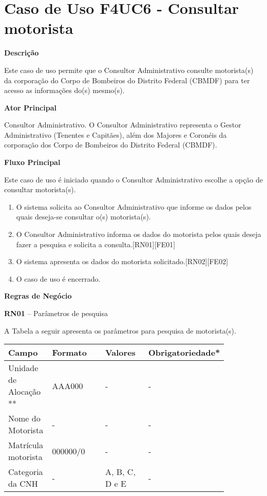 
  \section{Caso de Uso F4UC6 - Consultar motorista}

  {\raggedright
      \textbf{Descrição}
  }

    Este caso de uso permite que o Consultor Administrativo consulte motorista(s) da corporação do Corpo de Bombeiros do Distrito
    Federal (CBMDF) para ter acesso as informações do(s) mesmo(s). 

    
  {\raggedright
      \textbf{Ator Principal}
  }

    Consultor Administrativo. O Consultor Administrativo representa o Gestor Administrativo (Tenentes e Capitães), além dos Majores
    e Coronéis da corporação dos Corpo de Bombeiros do Distrito Federal (CBMDF).


  {\raggedright
      \textbf{Fluxo Principal}
  }
  
    Este caso de uso é iniciado quando o Consultor Administrativo escolhe a opção de consultar  motorista(s).
  
  \begin{enumerate}
    \item O sistema solicita ao Consultor Administrativo que informe os dados pelos quais deseja-se consultar o(s) motorista(s).
    \item O Consultor Administrativo  informa os dados do motorista pelos quais deseja fazer a pesquisa e solicita a consulta.[RN01][FE01]
    \item O sistema apresenta os dados do motorista solicitado.[RN02][FE02]
    \item O caso de uso é encerrado.

  \end{enumerate}
  
  
   {\raggedright
      \textbf{Regras de Negócio}
   }
   
   \textbf{RN01} –  Parâmetros de pesquisa
   
    A Tabela a seguir apresenta os parâmetros para pesquisa de motorista(s).
    
    \begin{table*}[!h]
    \centering
      \begin{tabular}{|p{0.20\linewidth}|p{0.25\linewidth}|p{0.20\linewidth}|p{0.20\linewidth}|}
      \hline
      Campo  & Formato & Valores & Obrigatoriedade*\\
      \hline

     Unidade de Alocação ** & AAA000 & - & -\\ \hline
      
      Nome do Motorista & - & - & -\\\hline
      
      Matrícula motorista & 000000/0 & - & -\\\hline
      
      Categoria da CNH & - & A, B, C, D e E & -\\\hline
      
      \hline
      \end{tabular}
    \end{table*}
    
